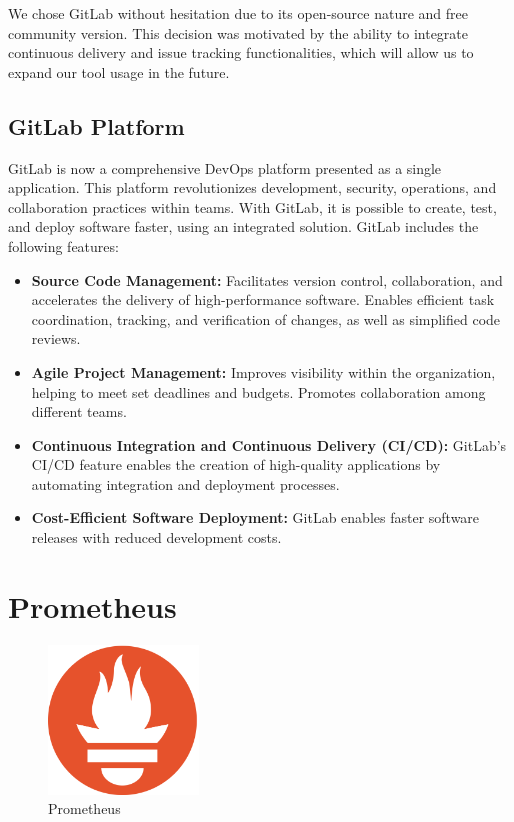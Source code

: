 We chose GitLab without hesitation due to its open-source nature and free community version. This decision was motivated by the ability to integrate continuous delivery and issue tracking functionalities, which will allow us to expand our tool usage in the future.

\subsection{GitLab Platform}

GitLab is now a comprehensive DevOps platform presented as a single application. This platform revolutionizes development, security, operations, and collaboration practices within teams. With GitLab, it is possible to create, test, and deploy software faster, using an integrated solution. GitLab includes the following features:
\begin{itemize}
    \item \textbf{Source Code Management:} Facilitates version control, collaboration, and accelerates the delivery of high-performance software. Enables efficient task coordination, tracking, and verification of changes, as well as simplified code reviews.
    \item \textbf{Agile Project Management:} Improves visibility within the organization, helping to meet set deadlines and budgets. Promotes collaboration among different teams.
    \item \textbf{Continuous Integration and Continuous Delivery (CI/CD):} GitLab's CI/CD feature enables the creation of high-quality applications by automating integration and deployment processes.
    \item \textbf{Cost-Efficient Software Deployment:} GitLab enables faster software releases with reduced development costs.
\end{itemize}

\section{Prometheus}

\begin{figure}[H]
  \centering
  \includegraphics[width=4cm]{Logos/prometheus-logo.png}
  \caption{Prometheus}
  \label{fig:prometheus_logo}
\end{figure}

